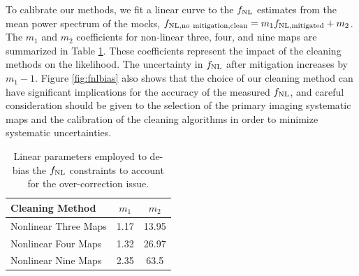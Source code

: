 
To calibrate our methods, we fit a linear curve to the $f_{\rm NL}$ estimates from the mean power spectrum of the mocks, $f_{\rm NL, no~mitigation, clean} = m_{1} f_{\rm NL, mitigated} + m_{2}$. The $m_{1}$ and $m_{2}$ coefficients for non-linear three, four, and nine maps are summarized in Table \ref{tab:debiasparams}. These coefficients represent the impact of the cleaning methods on the likelihood. The uncertainty in $f_{\rm NL}$ after mitigation increases by $m_{1}-1$. Figure \ref{fig:fnlbias} also shows that the choice of our cleaning method can have significant implications for the accuracy of the measured $f_{\rm NL}$, and careful consideration should be given to the selection of the primary imaging systematic maps and the calibration of the cleaning algorithms in order to minimize systematic uncertainties.


\begin{table}
\begin{center}
\caption{Linear parameters employed to de-bias the $f_{\rm NL}$ constraints to account for the over-correction issue.}\label{tab:debiasparams}
\begin{tabular}{lcc}
\hline
\hline
\textbf{Cleaning Method} & $m_{1}$ & $m_{2}$ \\
\hline
Nonlinear Three Maps & 1.17 & 13.95 \\
Nonlinear Four Maps & 1.32 & 26.97 \\
Nonlinear Nine Maps & 2.35 & 63.5\\
\hline
\end{tabular}
\end{center}
\end{table}
